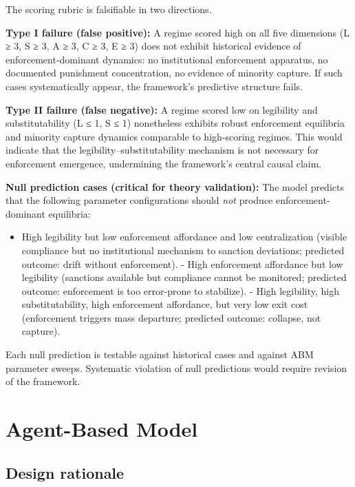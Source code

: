 \documentclass[12pt]{article}
\begin{document}
The scoring rubric is falsifiable in two directions.

\textbf{Type I failure (false positive):} A regime scored high on all five dimensions (L ≥ 3, S ≥ 3, A ≥ 3, C ≥ 3, E ≥ 3) does not exhibit historical evidence of enforcement-dominant dynamics: no institutional enforcement apparatus, no documented punishment concentration, no evidence of minority capture. If such cases systematically appear, the framework's predictive structure fails.

\textbf{Type II failure (false negative):} A regime scored low on legibility and substitutability (L ≤ 1, S ≤ 1) nonetheless exhibits robust enforcement equilibria and minority capture dynamics comparable to high-scoring regimes. This would indicate that the legibility--substitutability mechanism is not necessary for enforcement emergence, undermining the framework's central causal claim.

\textbf{Null prediction cases (critical for theory validation):} The model predicts that the following parameter configurations should \emph{not} produce enforcement-dominant equilibria:

\begin{itemize}
\item
  High legibility but low enforcement affordance and low centralization (visible compliance but no institutional mechanism to sanction deviations; predicted outcome: drift without enforcement). - High enforcement affordance but low legibility (sanctions available but compliance cannot be monitored; predicted outcome: enforcement is too error-prone to stabilize). - High legibility, high substitutability, high enforcement affordance, but very low exit cost (enforcement triggers mass departure; predicted outcome: collapse, not capture).
\end{itemize}

Each null prediction is testable against historical cases and against ABM parameter sweeps. Systematic violation of null predictions would require revision of the framework.

%
\section{Agent-Based Model}

%
\subsection{Design rationale}
\end{document}

